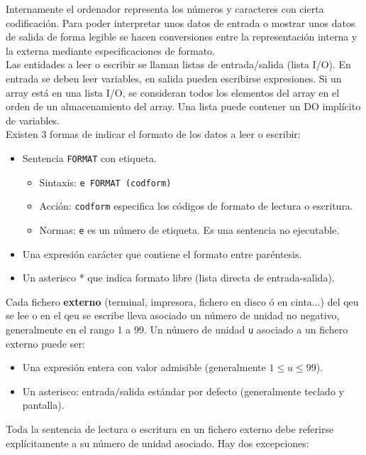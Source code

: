 Internamente el ordenador representa los números y caracteres con cierta codificación. Para poder interpretar unos datos de entrada o mostrar unos datos de salida de forma legible se hacen conversiones entre la representación interna y la externa mediante especificaciones de formato. \\

Las entidades a leer o escribir se llaman listas de entrada/salida (lista I/O). En entrada se deben leer variables, en salida pueden escribirse expresiones. Si un array está en una lista I/O, se consideran todos los elementos del array en el orden de un almacenamiento del array. Una lista puede contener un DO implícito de variables.  \\

Existen 3 formas de indicar el formato de los datos a leer o escribir:

\begin{itemize}
	\item Sentencia {\tt FORMAT} con etiqueta.
	\begin{itemize}
		\item Sintaxis: {\tt e FORMAT (codform)} 
		\item Acción: {\tt codform} especifica los códigos de formato de lectura o escritura. 
		\item Normas: {\tt e} es un número de etiqueta. Es una sentencia no ejecutable.
	\end{itemize}
	\item Una expresión carácter que contiene el formato entre paréntesis.
	\item Un asterisco * que indica formato libre (lista directa de entrada-salida).
\end{itemize}

Cada fichero {\bf externo} (terminal, impresora, fichero en disco ó en cinta...) del qeu se lee o en el qeu se escribe lleva asociado un número de unidad no negativo, generalmente en el rango 1 a 99. Un número de unidad {\tt u} asociado a un fichero externo puede ser:

\begin{itemize}
	\item Una expresión entera con valor admisible (generalmente $1\leq u \leq 99$).
	\item Un asterisco: entrada/salida estándar por defecto (generalmente teclado y pantalla).
\end{itemize}

Toda la sentencia de lectura o escritura en un fichero externo debe referirse explícitamente a su número de unidad asociado. Hay dos excepciones:

